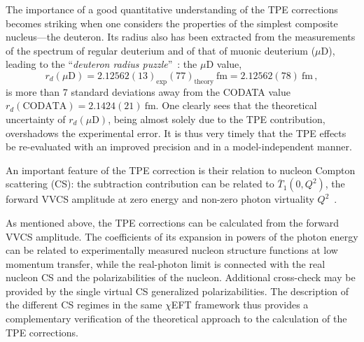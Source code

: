 \documentclass[prl,
twocolumn,
showpacs,preprintnumbers,amsmath,amssymb,
superscriptaddress,
a4paper,nofootinbib,longbibliography]{revtex4-2}
\begin{document}
The importance of a good quantitative understanding of the TPE corrections becomes striking when one considers the
properties of the simplest composite nucleus---the deuteron. Its radius also has been extracted from the measurements
of the spectrum of regular deuterium and of that of muonic deuterium ($\mu$D), leading to the ``{\it deuteron radius puzzle}''~\cite{Pohl1:2016xoo}: the $\mu$D value,
\begin{equation}
r_d(\mu\text{D})=2.12562(13)_\text{exp}(77)_\text{theory}\ \text{fm}=2.12562(78)\ \text{fm}\,,
\label{eq:rmud}
\end{equation}
is more than 7 standard deviations away from the CODATA value $r_d(\text{CODATA})=2.1424(21)\ \text{fm}$. One clearly sees that the theoretical
uncertainty of $r_d(\mu\text{D})$, being almost solely due to the TPE contribution, overshadows the experimental error. It is thus very timely that the TPE effects
be re-evaluated with an improved precision and in a model-independent manner.


An important feature of the TPE correction is their relation to nucleon Compton scattering (CS):
the subtraction contribution can be related to $\overline{T}_1(0,Q^2)$, the forward VVCS amplitude
at zero energy and non-zero photon virtuality $Q^2$~\cite{Hagelstein:2015egb}.


As mentioned above, the TPE corrections can be calculated from the forward VVCS amplitude.
The coefficients of its expansion in powers of the photon energy can be related to experimentally measured nucleon structure functions at low momentum transfer,
while the real-photon limit is connected with the real nucleon CS and the polarizabilities of the nucleon. Additional cross-check may be provided by
the single virtual CS generalized polarizabilities. The description of the different CS regimes in the same $\chi$EFT framework thus provides a complementary verification
of the theoretical approach to the calculation of the TPE corrections.
\end{document}

